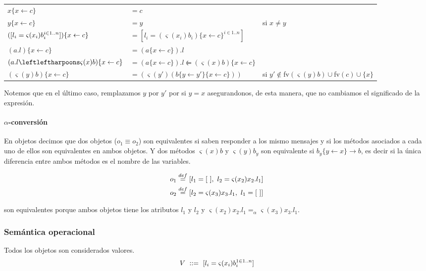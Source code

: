 \begin{center}
\begin{tabular}{lll}
	$x\{x \leftarrow c\}$ &$= c$ & \\
	$y\{x \leftarrow c\}$ &$= y$ & si $x\neq y$\\
	$([l_i = \varsigma(x_i)b_i^{i\in 1..n}])\{x \leftarrow c\}$ &$=  [l_i = (\varsigma(x_i)b_i)\{x \leftarrow c\}^{i\in 1..n}]$ & \\
	$(a.l)\{x \leftarrow c\}$ &$= (a\{x \leftarrow c\}).l $ & \\
	$(\OORedefinicion{a.l}{x}{b})\{x \leftarrow c\}$ &$= (a\{x \leftarrow c\}).l \leftleftharpoons (\varsigma(x)b)\{x \leftarrow c\} $ & \\
	$(\varsigma(y)b)\{x \leftarrow c\}$ &$= (\varsigma(y')(b\{y \leftarrow y'\}\{x \leftarrow c\})) $ & si $y'\notin$fv$(\varsigma(y)b)\cup$fv$(c)\cup\{x\}$ \\
\end{tabular}
\end{center}

Notemos que en el último caso, remplazamos $y$ por $y'$ por si $y = x$ asegurandonos, de esta manera, que no cambiamos el significado de la expresión.

\paragraph{$\alpha$-conversión} En objetos decimos que dos objetos ($o_1 \equiv o_2$) son equivalentes si saben responder a los mismo mensajes y si los métodos asociados a cada uno de ellos son equivalentes en ambos objetos. Y dos métodos $\varsigma(x)b$ y $\varsigma(y)b_y$ son equivalente si $b_y\{y\leftarrow x\}\longrightarrow b$, es decir si la única diferencia entre ambos métodos es el nombre de las variables.


\begin{align*}
	o_1 \overset{def}{=} [l_1 = [~],~l_2 = \varsigma(x_2)x_2.l_1] \\
	o_2 \overset{def}{=} [l_2 = \varsigma(x_3)x_3.l_1,~l_1 = [~]]
\end{align*}

son equivalentes porque ambos objetos tiene los atributos $l_1$ y $l_2$ y $\varsigma(x_2) x_2.l_1 =_\alpha \varsigma(x_3) x_3.l_1$.


\subsubsection{Semántica operacional}
Todos los objetos son considerados valores.
$$V~::=~[l_i = \varsigma(x_i)b_i^{1\in 1..n}]$$

